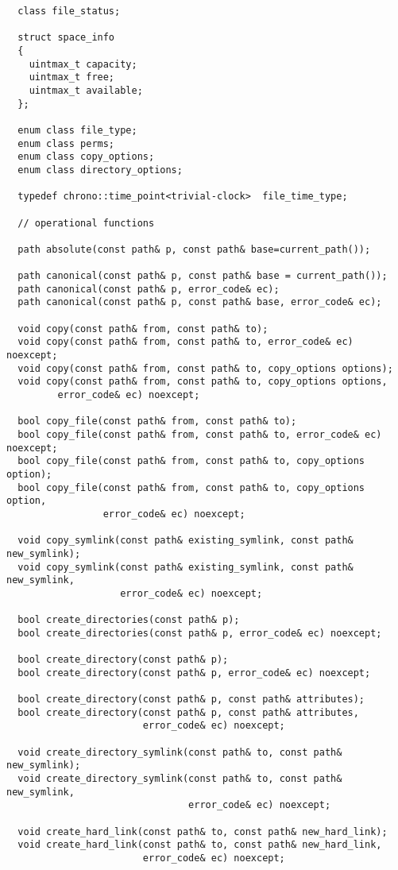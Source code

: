 \begin{verbatim}
  class file_status;

  struct space_info
  {
    uintmax_t capacity;
    uintmax_t free; 
    uintmax_t available;
  };

  enum class file_type;
  enum class perms;
  enum class copy_options;
  enum class directory_options;

  typedef chrono::time_point<trivial-clock>  file_time_type;

  // operational functions

  path absolute(const path& p, const path& base=current_path());

  path canonical(const path& p, const path& base = current_path());
  path canonical(const path& p, error_code& ec);
  path canonical(const path& p, const path& base, error_code& ec);

  void copy(const path& from, const path& to);
  void copy(const path& from, const path& to, error_code& ec) noexcept;
  void copy(const path& from, const path& to, copy_options options);
  void copy(const path& from, const path& to, copy_options options,  
         error_code& ec) noexcept;

  bool copy_file(const path& from, const path& to);
  bool copy_file(const path& from, const path& to, error_code& ec) noexcept;
  bool copy_file(const path& from, const path& to, copy_options option);
  bool copy_file(const path& from, const path& to, copy_options option,
                 error_code& ec) noexcept;

  void copy_symlink(const path& existing_symlink, const path& new_symlink);
  void copy_symlink(const path& existing_symlink, const path& new_symlink,
                    error_code& ec) noexcept;

  bool create_directories(const path& p);
  bool create_directories(const path& p, error_code& ec) noexcept;

  bool create_directory(const path& p);
  bool create_directory(const path& p, error_code& ec) noexcept;

  bool create_directory(const path& p, const path& attributes);
  bool create_directory(const path& p, const path& attributes,
                        error_code& ec) noexcept;

  void create_directory_symlink(const path& to, const path& new_symlink);
  void create_directory_symlink(const path& to, const path& new_symlink,
                                error_code& ec) noexcept;

  void create_hard_link(const path& to, const path& new_hard_link);
  void create_hard_link(const path& to, const path& new_hard_link,
                        error_code& ec) noexcept;


\end{verbatim}

